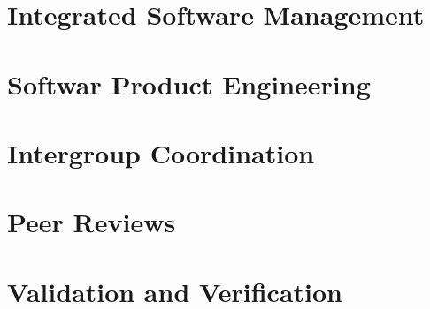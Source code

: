 \documentclass{article}
\begin{document}
\section{Integrated Software Management}

\section{Softwar Product Engineering}

\section{Intergroup Coordination}

\section{Peer Reviews}

\section{Validation and Verification}
\end{document}
